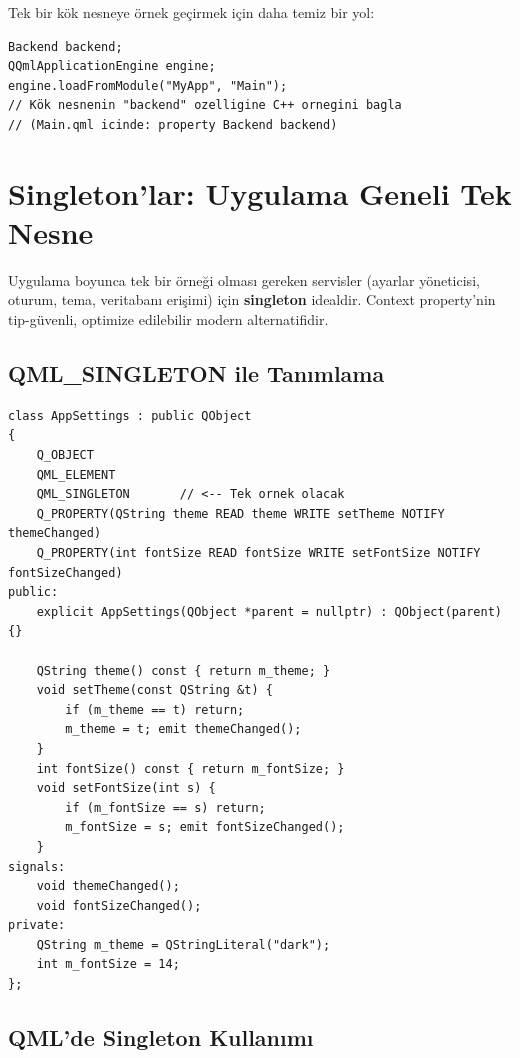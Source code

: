 \documentclass[11pt,a4paper]{article}
\begin{document}
Tek bir kök nesneye örnek geçirmek için daha temiz bir yol:

\begin{lstlisting}
Backend backend;
QQmlApplicationEngine engine;
engine.loadFromModule("MyApp", "Main");
// Kök nesnenin "backend" ozelligine C++ ornegini bagla
// (Main.qml icinde: property Backend backend)
\end{lstlisting}

\section{Singleton'lar: Uygulama Geneli Tek Nesne}

Uygulama boyunca tek bir örneği olması gereken servisler (ayarlar yöneticisi,
oturum, tema, veritabanı erişimi) için \textbf{singleton} idealdir. Context
property'nin tip-güvenli, optimize edilebilir modern alternatifidir.

\subsection{QML\_SINGLETON ile Tanımlama}

\begin{lstlisting}
class AppSettings : public QObject
{
    Q_OBJECT
    QML_ELEMENT
    QML_SINGLETON       // <-- Tek ornek olacak
    Q_PROPERTY(QString theme READ theme WRITE setTheme NOTIFY themeChanged)
    Q_PROPERTY(int fontSize READ fontSize WRITE setFontSize NOTIFY fontSizeChanged)
public:
    explicit AppSettings(QObject *parent = nullptr) : QObject(parent) {}

    QString theme() const { return m_theme; }
    void setTheme(const QString &t) {
        if (m_theme == t) return;
        m_theme = t; emit themeChanged();
    }
    int fontSize() const { return m_fontSize; }
    void setFontSize(int s) {
        if (m_fontSize == s) return;
        m_fontSize = s; emit fontSizeChanged();
    }
signals:
    void themeChanged();
    void fontSizeChanged();
private:
    QString m_theme = QStringLiteral("dark");
    int m_fontSize = 14;
};
\end{lstlisting}

\subsection{QML'de Singleton Kullanımı}
\end{document}
